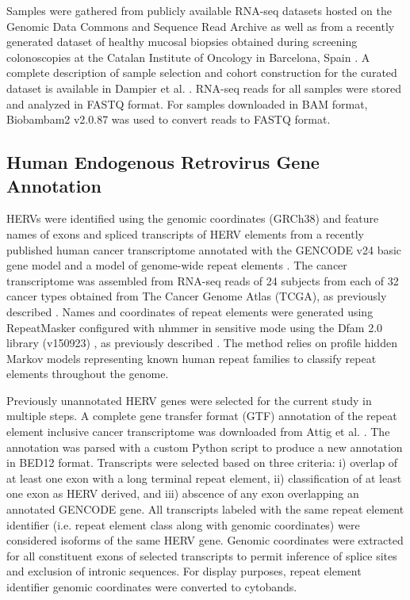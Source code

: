 \documentclass[11pt,letterpaper]{article}
\begin{document}
Samples were gathered from publicly available RNA-seq datasets hosted on the Genomic Data Commons and Sequence Read Archive as well as from a recently generated dataset of healthy mucosal biopsies obtained during screening colonoscopies at the Catalan Institute of Oncology in Barcelona, Spain \citep{Dampier2020, DiezObrero2020}.
A complete description of sample selection and cohort construction for the curated dataset is available in Dampier et al. \citep{Dampier2020}.
RNA-seq reads for all samples were stored and analyzed in FASTQ format.
For samples downloaded in BAM format, Biobambam2 v2.0.87 \citep{Tischler2014} was used to convert reads to FASTQ format.

\subsection*{Human Endogenous Retrovirus Gene Annotation}
HERVs were identified using the genomic coordinates (GRCh38) and feature names of exons and spliced transcripts of HERV elements from a recently published human cancer transcriptome annotated with the GENCODE v24 basic gene model \citep{Frankish2018} and a model of genome-wide repeat elements \citep{Attig2019}.
The cancer transcriptome was assembled from RNA-seq reads of 24 subjects from each of 32 cancer types obtained from The Cancer Genome Atlas (TCGA), as previously described \citep{Attig2019}.
Names and coordinates of repeat elements were generated using RepeatMasker \citep{Smit2015} configured with nhmmer \citep{Wheeler2013} in sensitive mode using the Dfam 2.0 library (v150923) \citep{Hubley2015}, as previously described \citep{Attig2017}.
The method relies on profile hidden Markov models representing known human repeat families to classify repeat elements throughout the genome.

Previously unannotated HERV genes were selected for the current study in multiple steps.
A complete gene transfer format (GTF) \citep{GTF} annotation of the repeat element inclusive cancer transcriptome was downloaded from Attig et al. \citep{Attig2019}.
The annotation was parsed with a custom Python script to produce a new annotation in BED12 \citep{BED12} format.
Transcripts were selected based on three criteria: i) overlap of at least one exon with a long terminal repeat element, ii) classification of at least one exon as HERV derived, and iii) abscence of any exon overlapping an annotated GENCODE gene.
All transcripts labeled with the same repeat element identifier (i.e. repeat element class along with genomic coordinates) were considered isoforms of the same HERV gene.
Genomic coordinates were extracted for all constituent exons of selected transcripts to permit inference of splice sites and exclusion of intronic sequences.
For display purposes, repeat element identifier genomic coordinates were converted to cytobands.
\end{document}
